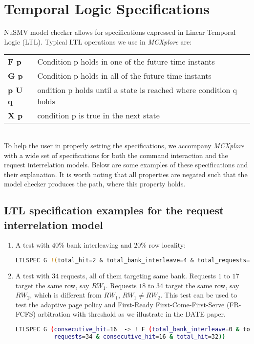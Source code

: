 \section{Temporal Logic Specifications}\label{sec:TL}

NuSMV model checker allows for specifications expressed in Linear Temporal Logic (LTL). 
Typical LTL operations we use in \textit{MCXplore} are: \\

\begin{tabular}{|l|l|}
\hline
\textbf{F p} & Condition p holds in one of the future time instants\\

\textbf{G p} & Condition p holds in all of the future time instants\\

\textbf{p U q} & ondition p holds until a state is reached where condition q holds\\

\textbf{X p} & condition p is true in the next state\\
\hline
\end{tabular}\\

To help the user in properly setting the specifications, we accompany \textit{MCXplore} with a wide set of specifications for both the command interaction and the request interrelation models. 
Below are some examples of these specifications and their explanation. 
It is worth noting that all properties are negated such that the model checker produces the path, where this property holds.\\ 

\subsection{LTL specification examples for the request interrelation model}
\begin{enumerate}[leftmargin=*]
\item A test with $40\%$ bank interleaving and $20\%$ row locality:
\begin{lstlisting}[language=bash]
LTLSPEC G !(total_hit=2 & total_bank_interleave=4 & total_requests=10)
\end{lstlisting} 

\item A test with $34$ requests, all of them targeting same bank. 
Requests $1$ to $17$ target the same row, say $RW_1$. 
Requests $18$ to $34$ target the same row, say $RW_2$, which is different from $RW_1$, $RW_1 \neq RW_2$. 
This test can be used to test the adaptive page policy and First-Ready First-Come-First-Serve (FR-FCFS) arbitration with threshold as we illustrate in the DATE paper. 

\begin{lstlisting}[language=bash]
LTLSPEC G (consecutive_hit=16  -> ! F (total_bank_interleave=0 & total_
           requests=34 & consecutive_hit=16 & total_hit=32))
\end{lstlisting} 
\end{enumerate} 



